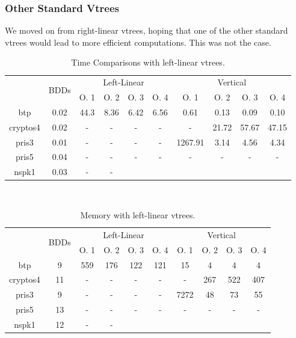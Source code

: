 \documentclass[11pt]{article}
\begin{document}
\subsubsection{Other Standard Vtrees}

We moved on from right-linear vtrees, hoping that one of the other standard vtrees would lead to more efficient computations. This was not the case. 


\begin{table}
\begin{tabular}{|*{10}{c|}}
\hline
\multirow{2}{*}{} & \multirow{2}{*}{BDDs} & \multicolumn{4}{c|}{Left-Linear} & \multicolumn{4}{c|}{Vertical}\\ \cline{3-10}
& & O. 1 & O. 2 & O. 3 & O. 4  & O. 1 & O. 2 & O. 3 & O. 4 \\ \hline
btp & 0.02& 44.3 & 8.36 & 6.42 & 6.56 & 0.61 & 0.13 & 0.09 & 0.10 \\ \hline
cryptos4 & 0.02 & - & - & - & - & - & 21.72 & 57.67 & 47.15 \\ \hline
pris3 & 0.01 & - & - & - & - & 1267.91 & 3.14 & 4.56 & 4.34 \\ \hline
pris5 & 0.04 &- &- &- &- & - &-  &- & -\\ \hline
nspk1 & 0.03 & - & - & & & & & & \\ \hline
\end{tabular}
\caption{Time Comparisons with left-linear vtrees.}
\label{table:otherstandardvtrees1time}
\end{table}
~
\begin{table}
\centering
\begin{tabular}{|*{10}{c|}}
\hline
\multirow{2}{*}{} & \multirow{2}{*}{BDDs} & \multicolumn{4}{c|}{Left-Linear} & \multicolumn{4}{c|}{Vertical}\\ \cline{3-10}
& & O. 1 & O. 2 & O. 3 & O. 4  & O. 1 & O. 2 & O. 3 & O. 4 \\ \hline
btp & 9 & 559 & 176 & 122 & 121 & 15 & 4 & 4 & 4 \\ \hline
cryptos4 & 11 & - & - & -& - & -  & 267 & 522 & 407 \\ \hline
pris3 & 9 & - & - & - & - & 7272 & 48 & 73 & 55 \\ \hline
pris5 & 13 & - &- &- &- &- &- &-&- \\ \hline
nspk1 & 12 & - &- & & & & & & \\ \hline
\end{tabular}
\caption{Memory with left-linear vtrees.}
\label{table:otherstandardvtrees1memory}
\end{table}
\end{document}
